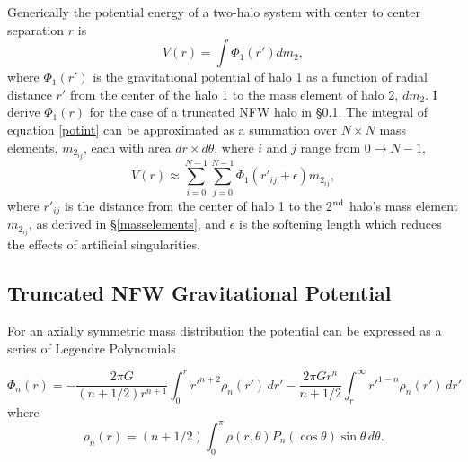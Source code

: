 Generically the potential energy of a two-halo system with center to center separation $r$ is 
\begin{equation}
V(r) = \int \Phi_1(r') dm_2,
\label{potint}
\end{equation}
where $\Phi_1(r')$ is the gravitational potential of halo 1 as a function of radial distance $r'$ from the center of the halo 1 to the mass element of halo 2, $dm_2$.  
I derive $\Phi_1(r)$ for the case of a truncated NFW halo in \S \ref{nfwpotential}.
The integral of equation \ref{potint} can be approximated as a summation over $N \times N$ mass elements, $m_{2_{ij}}$, each with area $dr\times d\theta$, where $i$ and $j$ range from $0 \rightarrow N-1$,
\begin{displaymath}
V(r) \approx \sum_{i=0}^{N-1}\sum_{j=0}^{N-1} \Phi_1(r'_{ij}+\epsilon) m_{2_{ij}},
\end{displaymath}
where $r'_{ij}$ is the distance from the center of halo 1 to the 2$^{\rm nd}$ halo's mass element $m_{2_{ij}}$, as derived in \S\ref{masselements}, and $\epsilon$ is the softening length which reduces the effects of artificial singularities.

\subsection{Truncated NFW Gravitational Potential}\label{nfwpotential}

For an axially symmetric mass distribution the potential can be expressed as a series of Legendre Polynomials

\begin{equation}
\Phi_n(r) = -\frac{2\pi G}{(n+1/2)r^{n+1}} \int_{0}^{r} r'^{n+2} \rho_{n}(r')\,dr' -\frac{2\pi G r^n}{n+1/2} \int_{r}^{\infty} r'^{1-n} \rho_n(r')\,dr' 
\label{axsympot}
\end{equation}
where
\begin{equation}
\rho_n(r) = (n+1/2) \int_{0}^{\pi} \rho(r,\theta) P_n(\cos \theta) \sin \theta \,d\theta.
\label{lengden}
\end{equation}

